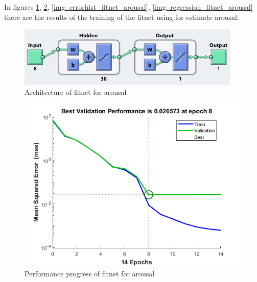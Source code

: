 \documentclass[a4paper]{report}
\begin{document}
	
	\noindent In figures \ref{img: fitnet_arousal}, \ref{img: perf_fitnet_arousal}, \ref{img: errorhist_fitnet_arousal}, \ref{img: regression_fitnet_arousal} there are the results of the training of the fitnet using for estimate arousal.
	\vspace{1cm}
		\begin{figure}[htbp]
		\centering
		\includegraphics[scale=1]{img/fitnet_arousal.png}
		\caption{Architecture of fitnet for arousal}
		\label{img: fitnet_arousal}
	\end{figure}
	
		
	\begin{figure}[htbp]
		\centering
		\includegraphics[scale=1]{img/perf_fitnet_arousal.png}
		\caption{Performance progress of fitnet for arousal}
		\label{img: perf_fitnet_arousal}
	\end{figure}
	
\end{document}
